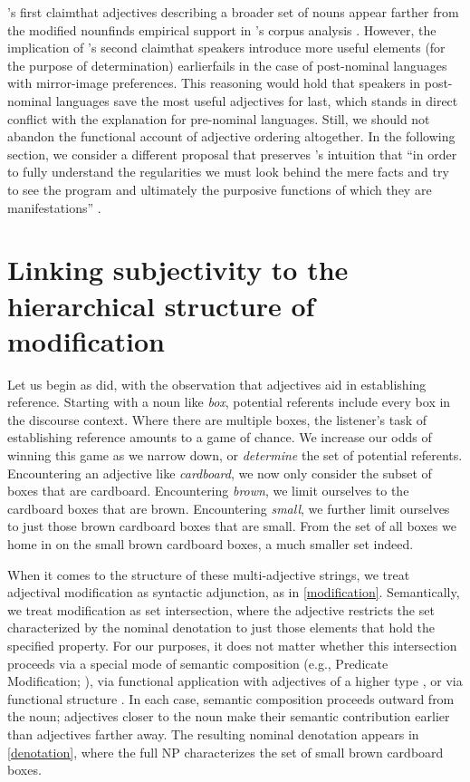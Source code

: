 \documentclass{sp}
\begin{document}
\citeauthor{seiler1978}'s first claim\dash that adjectives describing a broader set of nouns appear farther from the modified noun\dash finds empirical support in \citeauthor{wulff2003}'s corpus analysis . However, the implication of \citeauthor{seiler1978}'s second claim\dash that speakers introduce more useful elements (for the purpose of determination) earlier\dash fails in the case of post-nominal languages with mirror-image preferences. This reasoning would hold that speakers in post-nominal languages save the most useful adjectives for last, which stands in direct conflict with the explanation for pre-nominal languages. Still, we should not abandon the functional account of adjective ordering altogether. In the following section, we consider a different proposal that preserves \citeauthor{seiler1978}'s intuition that ``in order to fully understand the regularities we must look behind the mere facts and try to see the program and ultimately the purposive functions of which they are manifestations'' .

\section{Linking subjectivity to the hierarchical structure of modification} \label{proposal}

Let us begin as \citeauthor{seiler1978} did, with the observation that adjectives aid in establishing reference. Starting with a noun like \emph{box}, potential referents include every box in the discourse context. Where there are multiple boxes, the listener's task of establishing reference amounts to a game of chance. We increase our odds of winning this game as we narrow down, or \emph{determine} the set of potential referents. Encountering an adjective like \emph{cardboard}, we now only consider the subset of boxes that are cardboard. Encountering \emph{brown}, we limit ourselves to the cardboard boxes that are brown. Encountering \emph{small}, we further limit ourselves to just those brown cardboard boxes that are small. From the set of all boxes we home in on the small brown cardboard boxes, a much smaller set indeed.

When it comes to the structure of these multi-adjective strings, we treat adjectival modification as syntactic adjunction, as in \ref{modification}. Semantically, we treat modification as set intersection, where the adjective restricts the set characterized by the nominal denotation to just those elements that hold the specified property. For our purposes, it does not matter whether this intersection proceeds via a special mode of semantic composition (e.g., Predicate Modification; \citealp{heimkratzer1998}), via functional application with adjectives of a higher type \citep[e.g.,][]{parsons1970modifiers},
or via functional structure \citep[e.g.,][]{scontrasnicolae2014}. In each case, semantic composition proceeds outward from the noun; adjectives closer to the noun make their semantic contribution earlier than adjectives farther away. The resulting nominal denotation appears in \ref{denotation}, where the full NP characterizes the set of small brown cardboard boxes.
\end{document}
